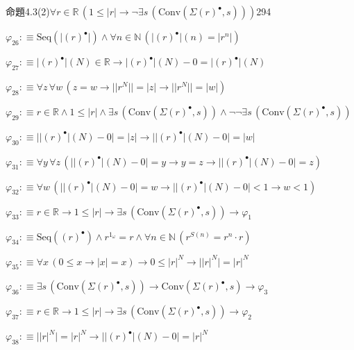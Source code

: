 \begin{fullproof}{命題4.3(2)}{$\forall r \in \mathbb{R}\,(1 \leq \lvert r \rvert \to \neg \exists s\,(\mathrm{Conv}(\Sigma {(r)^{\bullet}},s)))$}{294}
\begin{abbrevlist}
\item $\varphi_{26} :\equiv \mathrm{Seq}(\lvert {(r)^{\bullet}} \rvert) \land \forall n \in \mathbb{N}\,(\lvert {(r)^{\bullet}} \rvert(n) = \lvert {{r}^{n}} \rvert)$
\item $\varphi_{27} :\equiv \lvert {(r)^{\bullet}} \rvert(N) \in \mathbb{R} \to \lvert {(r)^{\bullet}} \rvert(N) - 0 = \lvert {(r)^{\bullet}} \rvert(N)$
\item $\varphi_{28} :\equiv \forall z\,\forall w\,(z = w \to \lvert \lvert {{r}^{N}} \rvert \rvert = \lvert z \rvert \to \lvert \lvert {{r}^{N}} \rvert \rvert = \lvert w \rvert)$
\item $\varphi_{29} :\equiv r \in \mathbb{R} \land 1 \leq \lvert r \rvert \land \exists s\,(\mathrm{Conv}(\Sigma {(r)^{\bullet}},s)) \land \neg \neg \exists s\,(\mathrm{Conv}(\Sigma {(r)^{\bullet}},s))$
\item $\varphi_{30} :\equiv \lvert \lvert {(r)^{\bullet}} \rvert(N) - 0 \rvert = \lvert z \rvert \to \lvert \lvert {(r)^{\bullet}} \rvert(N) - 0 \rvert = \lvert w \rvert$
\item $\varphi_{31} :\equiv \forall y\,\forall z\,(\lvert \lvert {(r)^{\bullet}} \rvert(N) - 0 \rvert = y \to y = z \to \lvert \lvert {(r)^{\bullet}} \rvert(N) - 0 \rvert = z)$
\item $\varphi_{32} :\equiv \forall w\,(\lvert \lvert {(r)^{\bullet}} \rvert(N) - 0 \rvert = w \to \lvert \lvert {(r)^{\bullet}} \rvert(N) - 0 \rvert < 1 \to w < 1)$
\item $\varphi_{33} :\equiv r \in \mathbb{R} \to 1 \leq \lvert r \rvert \to \exists s\,(\mathrm{Conv}(\Sigma {(r)^{\bullet}},s)) \to \varphi_{1}$
\item $\varphi_{34} :\equiv \mathrm{Seq}({(r)^{\bullet}}) \land {{r}^{1_{\omega}}} = r \land \forall n \in \mathbb{N}\,({{r}^{S(n)}} = {{r}^{n}} \cdot r)$
\item $\varphi_{35} :\equiv \forall x\,(0 \leq x \to \lvert x \rvert = x) \to 0 \leq {{\lvert r \rvert}^{N}} \to \lvert {{\lvert r \rvert}^{N}} \rvert = {{\lvert r \rvert}^{N}}$
\item $\varphi_{36} :\equiv \exists s\,(\mathrm{Conv}(\Sigma {(r)^{\bullet}},s)) \to \mathrm{Conv}(\Sigma {(r)^{\bullet}},s) \to \varphi_{3}$
\item $\varphi_{37} :\equiv r \in \mathbb{R} \to 1 \leq \lvert r \rvert \to \exists s\,(\mathrm{Conv}(\Sigma {(r)^{\bullet}},s)) \to \varphi_{2}$
\item $\varphi_{38} :\equiv \lvert {{\lvert r \rvert}^{N}} \rvert = {{\lvert r \rvert}^{N}} \to \lvert \lvert {(r)^{\bullet}} \rvert(N) - 0 \rvert = {{\lvert r \rvert}^{N}}$

\end{abbrevlist}
\end{fullproof}
